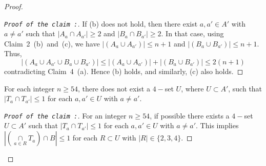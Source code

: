 \documentclass[reqno,10pt]{amsart}
\theoremstyle{definition}
\begin{document}
\begin{proof}
\begin{proof}[\tt{Proof of the claim} :]
If (b) does not hold, then there exist $a,a'\in A'$ with $a\neq a'$ such that $|A_{a}\cap A_{a'}|\geq 2$ and  $|B_{a}\cap B_{a'}|\geq 2$. In that case, using Claim~2~(b)~and~(c), we have $|(A_{a}\cup A_{a'})|\leq n+1$ and $|(B_{a}\cup B_{a'})|\leq n+1$. Thus, 
\begin{equation*}
    |(A_{a}\cup A_{a'}\cup B_{a}\cup B_{a'})|\leq |(A_{a}\cup A_{a'})|+|(B_{a}\cup B_{a'})|\leq 2(n+1)
\end{equation*}
contradicting Claim~4~(a). Hence (b) holds, and similarly, (c) also holds.
\end{proof}


 For each integer $n\geq54$, there does not exist a $4-$set $U$, where  $U\subset A'$, such that $|T_{a}\cap T_{a'}|\leq1$ for each $a,a'\in U$ with $a\neq a'$.  
\begin{proof}[\tt{Proof of the claim} :]\renewcommand{\qedsymbol}{}
For an integer $n\geq54$, if possible there exists a $4-$set $U\subset A'$ such that $|T_{a}\cap T_{a'}|\leq1$ for each $a,a'\in U$ with $a\neq a'$. This implies $\left|\left(\underset{a\in R}{\cap}T_{a}\right)\cap B\right|\leq1$ for each $R\subset U$ with $|R|\in\{2,3,4\}$.


\end{proof}
\end{proof}
\end{document}
